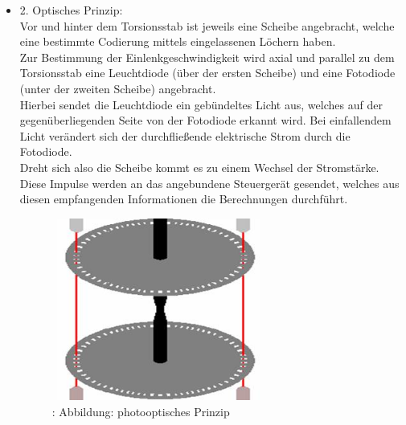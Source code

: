 \begin{itemize}
					\item 2. Optisches Prinzip:\\
							Vor und hinter dem Torsionsstab ist jeweils eine Scheibe angebracht, welche eine bestimmte Codierung mittels eingelassenen Löchern haben.\\
							Zur Bestimmung der Einlenkgeschwindigkeit wird axial und parallel zu dem Torsionsstab eine Leuchtdiode (über der ersten Scheibe) und eine Fotodiode (unter der zweiten Scheibe) angebracht. \\
							Hierbei sendet die Leuchtdiode ein gebündeltes Licht aus, welches auf der gegenüberliegenden Seite von der Fotodiode erkannt wird. Bei einfallendem Licht verändert sich der durchfließende elektrische Strom durch die Fotodiode.\\
							Dreht sich also die Scheibe kommt es zu einem Wechsel der Stromstärke. Diese Impulse werden an das angebundene Steuergerät gesendet, welches aus diesen empfangenden Informationen die Berechnungen durchführt.\\
							
							\begin{figure}
								\centering
								\includegraphics[width=7cm, height=6cm] {photoelektrisch.png}
 								\caption {\cite{TS14}: Abbildung: photooptisches Prinzip}
							\end{figure}	

				\end{itemize}

